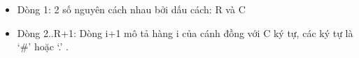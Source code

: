 \begin{itemize}
	\item     Dòng 1: 2 số nguyên cách nhau bởi dấu cách: R và C   
	\item     Dòng 2..R+1: Dòng i+1 mô tả hàng i của cánh đồng với C         ký tự, các ký tự là ‘\#’ hoặc ‘.’ .   
\end{itemize}

\